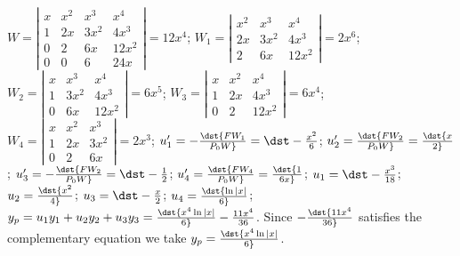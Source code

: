 \documentclass[dvips]{book}
\renewcommand{\exer}[1]{\par\medskip\;\noindent{\color{red}\bf #1.}}
\numberwithin{example}{section}
\numberwithin{equation}{section}
\numberwithin{theorem}{section}
\numberwithin{table}{section}
\numberwithin{figure}{section}
\begin{document}
\exer{9.4.16}
$W=\left|\begin{array}{cccc}x&x^2&x^3&x^4\\
1&2x&3x^2&4x^3\\0&2&6x&12x^2\\0&0&6&24x
\end{array}\right|=12x^4$;
$W_1=\left|\begin{array}{cccc}x^2&x^3&x^4\\
2x&3x^2&4x^3\\2&6x&12x^2\end{array}\right|=2x^6$;
$W_2=\left|\begin{array}{cccc}x&x^3&x^4\\
1&3x^2&4x^3\\0&6x&12x^2\end{array}\right|=6x^5$;
$W_3=\left|\begin{array}{cccc}x&x^2&x^4\\
1&2x&4x^3\\0&2&12x^2\end{array}\right|=6x^4$;
$W_4=\left|\begin{array}{cccc}x&x^2&x^3\\
1&2x&3x^2\\0&2&6x\end{array}\right|=2x^3$;
$u_1'=-\dst{FW_1\over P_0W}=\dst-{x^2\over 6}$;
$u_2'=\dst{FW_2\over P_0W}=\dst{x\over 2}$;
$u_3'=-\dst{FW_2\over P_0W}=\dst-{1\over 2}$;
$u_4'=\dst{FW_4\over P_0W}=\dst{1\over 6x}$;
$u_1=\dst-{x^3\over 18}$;
$u_2=\dst{x^2\over 4}$;
$u_3=\dst-{x\over 2}$;
$u_4=\dst{\ln|x|\over 6}$;
$y_p=u_1y_1+u_2y_2+u_3y_3=\dst
{x^4\ln|x|\over 6}-{11x^4\over 36}$.
Since $-\dst{11x^4\over 36}$ satisfies the complementary equation we
take
$y_p=\dst{x^4\ln|x|\over 6}$.
\end{document}
